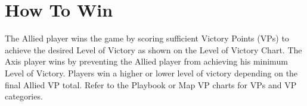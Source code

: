 \section{How To Win}

The Allied player wins the game by scoring sufficient Victory Points (VPs) to achieve the desired Level of Victory as shown on the Level of Victory Chart. The Axis player wins by preventing the Allied player from achieving his minimum Level of Victory. Players win a higher or lower level of victory depending on the final Allied VP total. Refer to the Playbook or Map VP charts for VPs and VP categories.